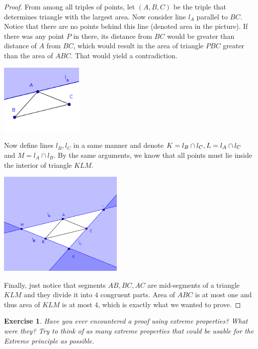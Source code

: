 \documentclass{article}
\newtheorem{exercise}{Exercise}
\begin{document}
\begin{proof}
From among all triples of points, let $(A, B, C)$ be the triple that determines triangle with the largest area. Now consider line $l_{A}$ parallel to $BC$. Notice that there are no points behind this line (denoted area in the picture).
If there was any point $P$ in there, its distance from $BC$ would be greater than distance of $A$ from $BC$, which would result in the area of triangle $PBC$ greater than the area of $ABC$. That would yield a contradiction.
\begin{center}
\includegraphics[width=0.3\textwidth]{img1}
\end{center}
Now define lines $l_{B}, l_{C}$ in a same manner and denote $K = l_{B} \cap l_{C},\\ L = l_{A} \cap l_{C}$ and $M = l_{A} \cap l_{B}$. By the same arguments, we know that all points must lie inside the interior of triangle $KLM$.
\begin{center}
\includegraphics[width=0.45\textwidth]{img2}
\end{center}
Finally, just notice that segments $AB, BC, AC$ are mid-segments of a triangle $KLM$ and they divide it into $4$ congruent parts. Area of $ABC$ is at most one and thus area of $KLM$ is at most $4$, which is exactly what we wanted to prove.
\end{proof}

\begin{exercise}
Have you ever encountered a proof using extreme properties? What were they? Try to think of as many extreme properties that could be usable for the Extreme principle as possible.
\end{exercise}
\end{document}
